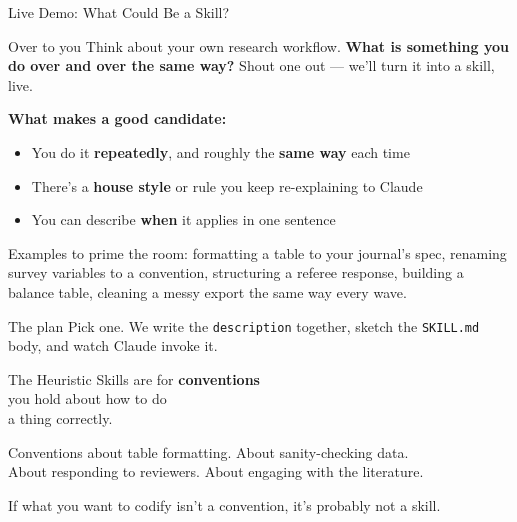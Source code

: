 \documentclass[aspectratio=169, 11pt]{beamer}
\begin{document}
\begin{frame}[label=skillextras]{Live Demo: What Could Be a Skill?}
  \begin{alertblock}{Over to you}
    Think about your own research workflow. \textbf{What is something you do over and over the same way?} Shout one out --- we'll turn it into a skill, live.
  \end{alertblock}

  \vspace{0.5em}
  \textbf{What makes a good candidate:}
  \begin{itemize}
    \item You do it \textbf{repeatedly}, and roughly the \textbf{same way} each time
    \item There's a \textbf{house style} or rule you keep re-explaining to Claude
    \item You can describe \textbf{when} it applies in one sentence
  \end{itemize}

  \vspace{0.4em}
  {\small Examples to prime the room: formatting a table to your journal's spec, renaming survey variables to a convention, structuring a referee response, building a balance table, cleaning a messy export the same way every wave.}

  \vspace{0.4em}
  \begin{block}{The plan}
    \footnotesize Pick one. We write the \texttt{description} together, sketch the \texttt{SKILL.md} body, and watch Claude invoke it.
  \end{block}
\end{frame}


\begin{frame}{The Heuristic}
  \centering
  \vspace{1em}
  {\Large Skills are for \textbf{conventions}\\[0.4em]
  you hold about how to do\\[0.4em]
  a thing correctly.}

  \vspace{1.2em}
  \small
  Conventions about table formatting. About sanity-checking data.\\[0.1em]
  About responding to reviewers. About engaging with the literature.

  \vspace{0.8em}
  \normalsize
  \alert{If what you want to codify isn't a convention, it's probably not a skill.}
\end{frame}
\end{document}
